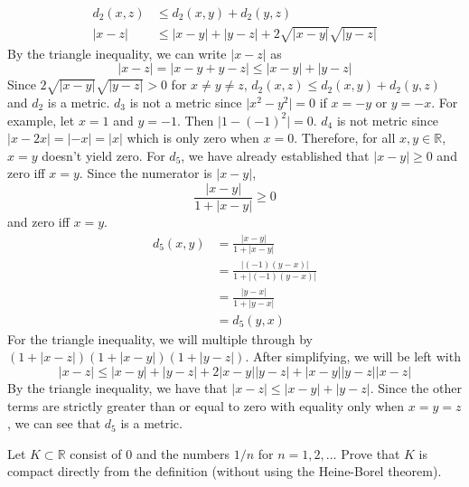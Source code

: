 \begin{exercise}
\begin{align*}
    d_2(x, z) & \leq d_2(x, y) + d_2(y, z)\\
    \lvert x - z\rvert & \leq \lvert x - y\rvert + \lvert y - z\rvert +
                         2\sqrt{\lvert x - y\rvert}\sqrt{\lvert y - z\rvert}
  \end{align*}
  By the triangle inequality, we can write \(\lvert x - z\rvert\) as
  \[
  \lvert x - z\rvert = \lvert x - y + y - z\rvert\leq\lvert x - y\rvert +
  \lvert y - z\rvert
  \]
  Since \(2\sqrt{\lvert x - y\rvert}\sqrt{\lvert y - z\rvert} > 0\) for
  \(x\neq y\neq z\), \(d_2(x,z)\leq d_2(x,y) + d_2(y,z)\) and \(d_2\) is a
  metric.
  \(d_3\) is not a metric since \(\lvert x^2 - y^2\rvert = 0\) if \(x = -y\) or
  \(y = -x\).
  For example, let \(x = 1\) and \(y = -1\).
  Then \(\lvert 1 - (-1)^2\rvert = 0\).
  \(d_4\) is not metric since \(\lvert x - 2x\rvert = \lvert -x\rvert =
  \lvert x\rvert\) which is only zero when \(x = 0\).
  Therefore, for all \(x,y\in\mathbb{R}\), \(x = y\) doesn't yield zero.
  For \(d_5\), we have already established that \(\lvert x - y\rvert\geq 0\)
  and zero iff \(x = y\).
  Since the numerator is \(\lvert x - y\lvert\),
  \[
  \frac{\lvert x - y\rvert}{1 + \lvert x - y\rvert}\geq 0
  \]
  and zero iff \(x = y\).
  \begin{align*}
    d_5(x, y) & = \frac{\lvert x - y\rvert}{1 + \lvert x - y\rvert}\\
              & = \frac{\lvert (-1)(y - x)\rvert}
                {1 + \lvert (-1)(y - x)\rvert}\\
              & = \frac{\lvert y - x\rvert}{1 + \lvert y - x\rvert}\\
              & = d_5(y, x)
  \end{align*}
  For the triangle inequality, we will multiple through by
  \((1 + \lvert x - z\rvert)(1 + \lvert x - y\rvert)(1 + \lvert y - z\rvert)\).
  After simplifying, we will be left with
  \[
  \lvert x - z\rvert\leq\lvert x - y\rvert + \lvert y - z\rvert +
  2\lvert x - y\rvert\lvert y - z\rvert + \lvert x - y\rvert\lvert y - z\rvert
  \lvert x - z\rvert
  \]
  By the triangle inequality, we have that
  \(\lvert x - z\rvert\leq\lvert x - y\rvert + \lvert y - z\rvert\).
  Since the other terms are strictly greater than or equal to zero with
  equality only when \(x = y = z\), we can see that \(d_5\) is a metric.
\item
  Let \(K\subset\mathbb{R}\) consist of \(0\) and the numbers \(1/n\) for
  \(n = 1,2,\ldots\)
  Prove that \(K\) is compact directly from the definition (without using the
  Heine-Borel theorem).

\end{exercise}
